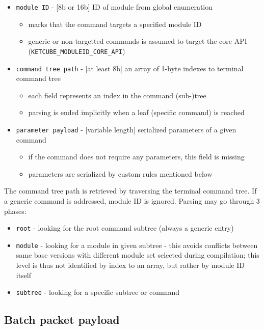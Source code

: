 \begin{itemize}
	\item \texttt{module ID} - [8b or 16b] ID of module from global enumeration
		\begin{itemize}
			\item marks that the command targets a specified module ID
			\item generic or non-targetted commands is assumed to target the core API (\texttt{KETCUBE\_MODULEID\_CORE\_API})
		\end{itemize}
	\item \texttt{command tree path} - [at least 8b] an array of 1-byte indexes to terminal command tree
		\begin{itemize}
			\item each field represents an index in the command (sub-)tree
			\item parsing is ended implicitly when a leaf (specific command) is reached
		\end{itemize}
	\item \texttt{parameter payload} - [variable length] serialized parameters of a given command
		\begin{itemize}
			\item if the command does not require any parameters, this field is missing
			\item parameters are serialized by custom rules mentioned below
		\end{itemize}
\end{itemize}

The command tree path is retrieved by traversing the terminal command tree. If a generic command is addressed, module ID is ignored. Parsing may go through 3 phases:

\begin{itemize}
	\item \texttt{root} - looking for the root command subtree (always a generic entry)
	\item \texttt{module} - looking for a module in given subtree - this avoids conflicts between same base versions with different module set selected during compilation; this level is thus not identified by index to an array, but rather by module ID itself
	\item \texttt{subtree} - looking for a specific subtree or command
\end{itemize}

\subsection{Batch packet payload}

